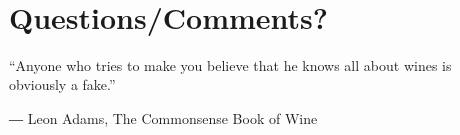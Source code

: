\documentclass[11pt]{article}
\begin{document}
    \begin{center}
    \end{center}
    { \hspace*{\fill} \\}
    
    \section{Questions/Comments?}\label{questionscomments}

``Anyone who tries to make you believe that he knows all about wines is
obviously a fake.''

― Leon Adams, The Commonsense Book of Wine


    
    
    
    
\end{document}
